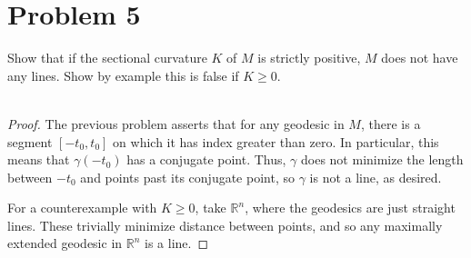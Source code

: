 \documentclass[fontsize=11pt]{scrartcl} %
\numberwithin{equation}{section} %
\numberwithin{figure}{section} %
\numberwithin{table}{section} %
\newcommand{\R}{\mathbb{R}}
\begin{document}
\section*{Problem 5}
Show that if the sectional curvature $K$ of $M$ is strictly positive, $M$ does
not have any lines. Show by example this is false if $K\geq 0$.
\\
\\
\begin{proof}
    The previous problem asserts that for any geodesic in $M$, there is a
    segment $[-t_0,t_0]$ on which it has index greater than zero. In particular,
    this means that $\gamma(-t_0)$ has a conjugate point. Thus, $\gamma$ does
    not minimize the length between $-t_0$ and points past its conjugate point,
    so $\gamma$ is not a line, as desired.

    For a counterexample with $K\geq 0$, take $\R^n$, where the geodesics are
    just straight lines. These trivially minimize distance between points, and
    so any maximally extended geodesic in $\R^n$ is a line.
\end{proof}
\end{document}
